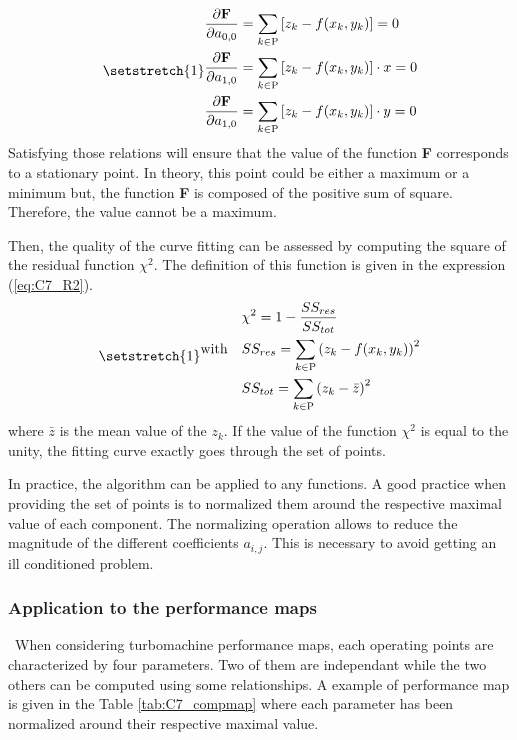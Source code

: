 \begin{subequations}
\setstretch{1}
\begin{align}
    \frac{\partial \textbf{F}}{\partial a_{0,0}} &=\sum_{k\in\textsc{P}}\left[z_k - f(x_k, y_k)\right] = 0\\
    \frac{\partial \textbf{F}}{\partial a_{1,0}} &=\sum_{k\in\textsc{P}}\left[z_k - f(x_k, y_k)\right]\cdot x = 0\\
    \frac{\partial \textbf{F}}{\partial a_{1,0}} &=\sum_{k\in\textsc{P}}\left[z_k - f(x_k, y_k)\right]\cdot y = 0
\end{align}\label{eq:C7_lqcond}
\end{subequations}
Satisfying those relations will ensure that the value of the function \textbf{F} corresponds to a stationary point. In theory, this point could be either a maximum or a minimum but, the function \textbf{F} is composed of the positive sum of square. Therefore, the value cannot be a maximum. 

Then, the quality of the curve fitting can be assessed by computing the square of the residual function $\chi^2$. The definition of this function is given in the expression (\ref{eq:C7_R2}).
\begin{equation}
\setstretch{1}
\begin{aligned}
& & &  \chi^2 = 1 - \frac{SS_{res}}{SS_{tot}} \\
&\text{with}
& & SS_{res} = \sum_{k\in\textsc{P}}\left(z_k - f(x_k,y_k)\right)^2\\
& & & SS_{tot} = \sum_{k\in\textsc{P}}\left(z_k - \bar{z}\right)^2
\end{aligned}\label{eq:C7_R2}
\end{equation}
where $\bar{z}$ is the mean value of the $z_k$. If the value of the function $\chi^2$ is equal to the unity, the fitting curve exactly goes through the set of points. 

In practice, the algorithm can be applied to any functions. A good practice when providing the set of points is to normalized them around the respective maximal value of each component. The normalizing operation allows to reduce the magnitude of the different coefficients $a_{i,j}$. This is necessary to avoid getting an ill conditioned problem.

\subsubsection{Application to the performance maps}
\quad\ When considering turbomachine performance maps, each operating points are characterized by four parameters. Two of them are independant while the two others can be computed using some relationships. A example of performance map is given in the Table \ref{tab:C7_compmap} where each parameter has been normalized around their respective maximal value.

